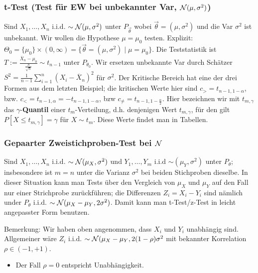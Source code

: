\subsubsection{t-Test (Test für EW bei unbekannter Var, $\mathcal{N}(\mu, \sigma^2)$)}
Sind $X_1, \dots, X_n$ i.i.d. $\sim \mathcal{N}(\mu, \sigma^2)$ unter $P_{\overrightarrow{\theta}}$ wobei $\overrightarrow{\theta} = (\mu, \sigma^2)$ und die Var $\sigma^2$ ist unbekannt. Wir wollen die Hypothese $\mu = \mu_0$ testen. Explizit: $\Theta_0 = \{\mu_0\} \times (0, \infty) = \{\overrightarrow{\theta} = (\mu, \sigma^2) \mid \mu = \mu_0\}$. Die Teststatistik ist $T := \frac{\overline{X}_n - \mu_0}{\frac{S}{\sqrt{n}}} \sim t_{n - 1}$ unter $P_{\theta_0}$. Wir ersetzen unbekannte Var durch Schätzer $S^2 = \frac{1}{n - 1} \sum_{i=1}^{n} (X_i - \overline{X}_n)^2$ für $\sigma^2$.
Der Kritische Bereich hat eine der drei Formen aus dem letzten Beispiel; die kritischen Werte hier sind $c_> = t_{n - 1, 1 - \alpha}$, bzw. $c_< = t_{n - 1, \alpha} = -t_{n - 1, 1 - \alpha}$, bzw $c_{\neq} = t_{n - 1, 1 - \frac{\alpha}{2}}$. Hier bezeichnen wir mit $t_{m, \gamma}$ das $\gamma$-\textbf{Quantil} einer $t_m$-Verteilung, d.h. denjenigen Wert $t_{m, \gamma}$, für den gilt $P[X \le t_{m, \gamma}] = \gamma$ für $X \sim t_m$. Diese Werte findet man in Tabellen.

\subsubsection{Gepaarter Zweistichproben-Test bei $\mathcal{N}$}
Sind $X_1, \dots, X_n$ i.i.d. $\sim \mathcal{N}(\mu_X, \sigma^2)$ und $Y_1, \dots, Y_m$ i.i.d $\sim(\mu_Y, \sigma^2)$ unter $P_\theta$; insbesondere ist $m = n$ unter die Varianz $\sigma^2$ bei beiden Stichproben dieselbe. In dieser Situation kann man Tests über den Vergleich von $\mu_X$ und $\mu_Y$ auf den Fall nur einer Strichprobe zurückführen; die Differenzen $Z_i = X_i - Y_i$ sind nämlich under $P_\theta$ i.i.d. $\sim \mathcal{N}(\mu_X - \mu_Y, 2 \sigma^2)$. Damit kann man t-Test/z-Test in leicht angepasster Form benutzen.

Bemerkung: Wir haben oben angenommen, dass $X_i$ und $Y_i$ unabhängig sind. Allgemeiner wäre $Z_i$ i.i.d. $\sim \mathcal{N}(\mu_X - \mu_Y, 2 (1 - \rho)\sigma^2$ mit bekannter Korrelation $\rho \in (-1, +1)$.
    \begin{itemize}
        \item Der Fall $\rho = 0$ entspricht Unabhängigkeit.
    \end{itemize}

